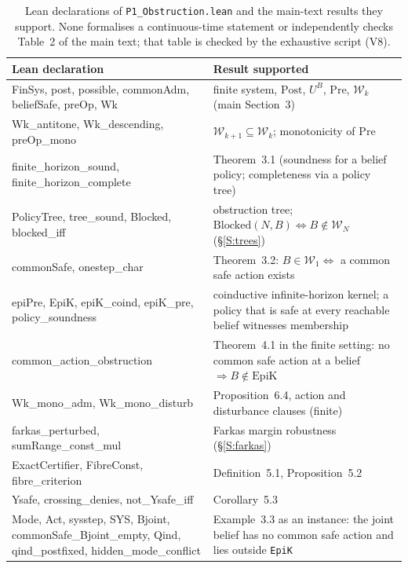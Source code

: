 \documentclass[11pt,a4paper]{article}
\theoremstyle{plain}
\theoremstyle{definition}
\theoremstyle{remark}
\newcommand{\cW}{\mathcal{W}}
\newcommand{\Post}{\mathrm{Post}}
\newcommand{\Pre}{\mathrm{Pre}}
\begin{document}
\begin{table}[htbp]
\centering\small
\begin{tabularx}{\textwidth}{@{}>{\ttfamily\raggedright\arraybackslash}p{}X@{}}
\toprule
\normalfont Lean declaration & Result supported\\
\midrule
FinSys, post, possible, commonAdm, beliefSafe, preOp, Wk & finite system, $\Post$, $U^B$, $\Pre$, $\cW_k$ (main Section~3)\\
Wk\_antitone, Wk\_descending, preOp\_mono & $\cW_{k+1}\subseteq\cW_k$; monotonicity of $\Pre$\\
finite\_horizon\_sound, finite\_horizon\_complete & Theorem~3.1 (soundness for a belief policy; completeness via a policy tree)\\
PolicyTree, tree\_sound, Blocked, blocked\_iff & obstruction tree; $\mathrm{Blocked}(N,B)\iff B\notin\cW_N$ (\S\ref{S:trees})\\
commonSafe, onestep\_char & Theorem~3.2: $B\in\cW_1\iff$ a common safe action exists\\
epiPre, EpiK, epiK\_coind, epiK\_pre, policy\_soundness & coinductive infinite-horizon kernel; a policy that is safe at every reachable belief witnesses membership\\
common\_action\_obstruction & Theorem~4.1 in the finite setting: no common safe action at a belief $\Rightarrow B\notin\mathrm{EpiK}$\\
Wk\_mono\_adm, Wk\_mono\_disturb & Proposition~6.4, action and disturbance clauses (finite)\\
farkas\_perturbed, sumRange\_const\_mul & Farkas margin robustness (\S\ref{S:farkas})\\
ExactCertifier, FibreConst, fibre\_criterion & Definition~5.1, Proposition~5.2\\
Ysafe, crossing\_denies, not\_Ysafe\_iff & Corollary~5.3\\
Mode, Act, sysstep, SYS, Bjoint, commonSafe\_Bjoint\_empty, Qind, qind\_postfixed, hidden\_mode\_conflict & Example~3.3 as an instance: the joint belief has no common safe action and lies outside \texttt{EpiK}\\
\bottomrule
\end{tabularx}
\caption{Lean declarations of \texttt{P1\_Obstruction.lean} and the main-text results they support. None formalises a continuous-time statement or independently checks Table~2 of the main text; that table is checked by the exhaustive script (V8).}
\label{tab:lean}
\end{table}
\end{document}
